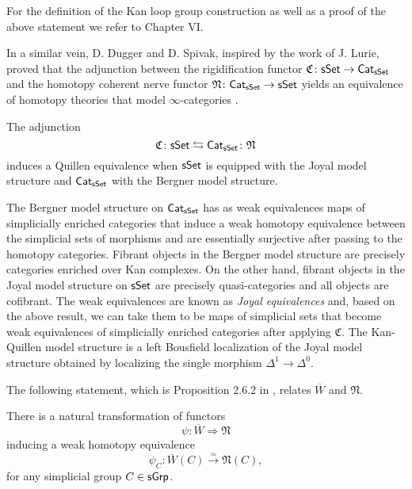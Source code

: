  For the definition of the Kan loop group construction as well as a proof of the above statement we refer to \cite{Goerss-Jardine} Chapter VI. 

In a similar vein, D. Dugger and D. Spivak, inspired by the work of J. Lurie,  proved that the adjunction between the rigidification functor $\mathfrak{C} \colon \mathsf{sSet} \to \mathsf{Cat}_{\mathsf{sSet}}$ and the homotopy coherent nerve functor $\mathfrak{N} \colon \mathsf{Cat}_{\mathsf{sSet}} \to \mathsf{sSet}$ yields an equivalence of homotopy theories that model $\infty$-categories \cite{dugger2011rigidification}.

\begin{theorem} \label{joyalbergner} The adjunction $$ \mathfrak{C} \colon \mathsf{sSet} \leftrightarrows \mathsf{Cat}_{\mathsf{sSet}} \colon \mathfrak{N}$$ induces a Quillen equivalence when $\mathsf{sSet}$ is equipped with the Joyal model structure and $\mathsf{Cat}_{\mathsf{sSet}}$ with the Bergner model structure.
\end{theorem}


\begin{remark} The Bergner model structure on $\mathsf{Cat}_{\mathsf{sSet}}$ has as weak equivalences maps of simplicially enriched categories that induce a weak homotopy equivalence between the simplicial sets of morphisms and are essentially surjective after passing to the homotopy categories. Fibrant objects in the Bergner model structure are precisely categories enriched over Kan complexes. On the other hand, fibrant objects in the Joyal model structure on $\mathsf{sSet}$ are precisely quasi-categories and all objects are cofibrant. The weak equivalences are known as \textit{Joyal equivalences} and, based on the above result, we can take them to be maps of simplicial sets that become weak equivalences of simplicially enriched categories after applying $\mathfrak{C}$. The Kan-Quillen model structure is a left Bousfield localization of the Joyal model structure obtained by localizing the single morphism $\Delta^1 \to \Delta^0.$
\end{remark}


The following statement, which is Proposition 2.6.2 in \cite{hinich2007deformation}, relates $\overline{W}$ and $\mathfrak{N}$.

\begin{proposition}\label{hinich} There is a natural transformation of functors $$\psi: \overline{W} \Longrightarrow \mathfrak{N}$$ inducing a weak homotopy equivalence
$$\psi_C: \overline{W}(C) \xrightarrow{\simeq} \mathfrak{N}(C),$$ for any simplicial group $C \in \mathsf{sGrp}$. 
\end{proposition} 

